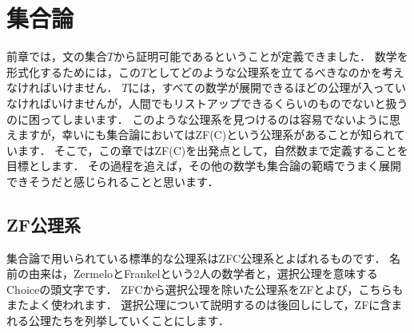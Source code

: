\documentclass[./main]{subfiles}
\begin{document}
\section{集合論}

前章では，文の集合$T$から証明可能であるということが定義できました．
数学を形式化するためには，この$T$としてどのような公理系を立てるべきなのかを考えなければいけません．
$T$には，すべての数学が展開できるほどの公理が入っていなければいけませんが，人間でもリストアップできるくらいのものでないと扱うのに困ってしまいます．
このような公理系を見つけるのは容易でないように思えますが，幸いにも集合論においてはZF(C)という公理系があることが知られています．
そこで，この章ではZF(C)を出発点として，自然数まで定義することを目標とします．
その過程を追えば，その他の数学も集合論の範疇でうまく展開できそうだと感じられることと思います．

\subsection{ZF公理系}

集合論で用いられている標準的な公理系はZFC公理系とよばれるものです．
名前の由来は，ZermeloとFrankelという2人の数学者と，選択公理を意味するChoiceの頭文字です．
ZFCから選択公理を除いた公理系をZFとよび，こちらもまたよく使われます．
選択公理について説明するのは後回しにして，ZFに含まれる公理たちを列挙していくことにします．
\end{document}
